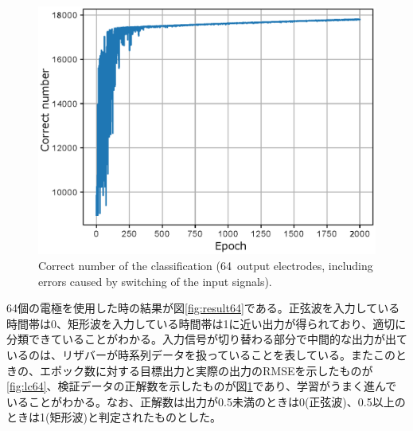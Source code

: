 \documentclass[a4j, twocolumn]{jsarticle}
\begin{document}
\begin{figure}
\centering
\includegraphics[width=1\hsize]{./figures/learning_curvesinsqr128_32i_l_hilsinsqr128_32i_l2_hil_num_neuron64_ramdomselected_timesequence_epoch2000_batchsize128_mask10_eta30_transition0_loopnum9_r2} 
\caption{Correct number of the classification (64~output electrodes, including errors caused by switching of the input signals).}
\label{fig:nc64}
\end{figure}

64個の電極を使用した時の結果が図\ref{fig:result64}である。正弦波を入力している時間帯は0、矩形波を入力している時間帯は1に近い出力が得られており、適切に分類できていることがわかる。入力信号が切り替わる部分で中間的な出力が出ているのは、リザバーが時系列データを扱っていることを表している。またこのときの、エポック数に対する目標出力と実際の出力のRMSEを示したものが\ref{fig:lc64}、検証データの正解数を示したものが図\ref{fig:nc64}であり、学習がうまく進んでいることがわかる。なお、正解数は出力が0.5未満のときは0(正弦波)、0.5以上のときは1(矩形波)と判定されたものとした。
\end{document}
